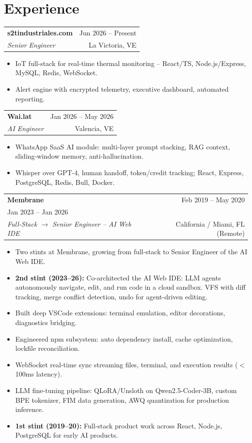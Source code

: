 \documentclass[12pt,letterpaper]{article}
\makeatletter
\newcommand{\jobentry}[4]{%
  \par\vspace{5pt}%
  \noindent
  \begin{tabularx}{\textwidth}{@{}X r@{}}
    \textbf{\color{textcolor}#1} & \scriptsize\color{muted}#2 \\[1pt]
    \small\itshape\color{accent}#3 & \scriptsize\color{muted}#4 \\
  \end{tabularx}
  \vspace{0pt}
}
\newenvironment{jobbullets}{%
  \begin{itemize}[leftmargin=10pt,itemsep=0pt,parsep=0pt,topsep=0pt,label=\textcolor{accent}{\tiny$\blacksquare$}]
  \footnotesize\color{textcolor}
}{%
  \end{itemize}
}
\makeatother
\begin{document}
\noindent
\begin{minipage}[t]{0.70\textwidth}
\section{Experience}

\jobentry{s2tindustriales.com}{Jun 2026 -- Present}{Senior Engineer}{La Victoria, VE}
\begin{jobbullets}
\item IoT full-stack for real-time thermal monitoring -- React/TS, Node.js/Express, MySQL, Redis, WebSocket.
\item Alert engine with encrypted telemetry, executive dashboard, automated reporting.
\end{jobbullets}

\jobentry{Wai.lat}{Jan 2026 -- May 2026}{AI Engineer}{Valencia, VE}
\begin{jobbullets}
\item WhatsApp SaaS AI module: multi-layer prompt stacking, RAG context, sliding-window memory, anti-hallucination.
\item Whisper over GPT-4, human handoff, token/credit tracking; React, Express, PostgreSQL, Redis, Bull, Docker.
\end{jobbullets}

\jobentry{Membrane}{Feb 2019 -- May 2020 \\ Jan 2023 -- Jan 2026}{Full-Stack $\rightarrow$ Senior Engineer -- AI Web IDE}{California / Miami, FL (Remote)}
\begin{jobbullets}
\item Two stints at Membrane, growing from full-stack to Senior Engineer of the AI Web IDE.
\item \textbf{2nd stint (2023--26):} Co-architected the AI Web IDE: LLM agents autonomously navigate, edit, and run code in a cloud sandbox. VFS with diff tracking, merge conflict detection, undo for agent-driven editing.
\item Built deep VSCode extensions: terminal emulation, editor decorations, diagnostics bridging.
\item Engineered npm subsystem: auto dependency install, cache optimization, lockfile reconciliation.
\item WebSocket real-time sync streaming files, terminal, and execution results ($<$100ms latency).
\item LLM fine-tuning pipeline: QLoRA/Unsloth on Qwen2.5-Coder-3B, custom BPE tokenizer, FIM data generation, AWQ quantization for production inference.
\item \textbf{1st stint (2019--20):} Full-stack product work across React, Node.js, PostgreSQL for early AI products.
\end{jobbullets}


\end{minipage}
\end{document}
